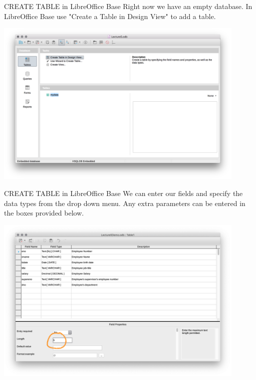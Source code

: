 \documentclass[xcolor=svgnames]{beamer}
\theoremstyle{example}
\begin{document}
\begin{frame}{CREATE TABLE in LibreOffice Base}
Right now we have an empty database. In LibreOffice Base use "Create a Table in Design View" to add a table.
\begin{center}
\includegraphics[width=0.9\textwidth]{img/LibreOffice}
\end{center}
\end{frame}


 \begin{frame}{CREATE TABLE in LibreOffice Base}
We can enter our fields and specify the data types from the drop down menu.  Any extra parameters can be entered in the boxes provided below. 
\begin{center}
\includegraphics[width=0.9\textwidth]{img/LibreOffice3}
\end{center}
% 
\end{frame}
\end{document}
